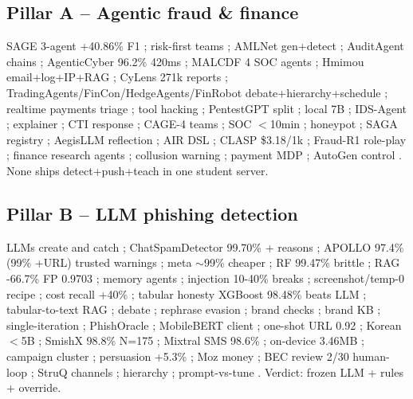 \documentclass[11pt,a4paper]{article}
\begin{document}
\subsection{Pillar A -- Agentic fraud \& finance}
SAGE 3-agent +40.86\% F1 \cite{SAGE26}; risk-first teams \cite{RiskFirst26}; AMLNet gen+detect \cite{AMLNet25}; AuditAgent chains \cite{AuditAgent25}; AgenticCyber 96.2\% 420ms \cite{AgenticCyber25}; MALCDF 4 SOC agents \cite{MALCDF25}; Hmimou email+log+IP+RAG \cite{Hmimou25}; CyLens 271k reports \cite{CyLens25}; TradingAgents/FinCon/HedgeAgents/FinRobot debate+hierarchy+schedule \cite{TradingAgents24,FinCon24,HedgeAgents25,FinRobot24}; realtime payments triage \cite{IJCISIM26}; tool hacking \cite{FangHack24,FangExploit24}; PentestGPT split \cite{PentestGPT24}; local 7B \cite{Rigaki24}; IDS-Agent \cite{IDSAgent24}; explainer \cite{Houssel24}; CTI response \cite{Tellache25}; CAGE-4 teams \cite{Castro25}; SOC $<$10min \cite{Saju26}; honeypot \cite{Honeypot24}; SAGA registry \cite{SAGA25}; AegisLLM reflection \cite{Aegis25}; AIR DSL \cite{AIR26}; CLASP \$3.18/1k \cite{CLASP25}; Fraud-R1 role-play \cite{FraudR125}; finance research agents \cite{Park24,FinAgent24,FinCon24,TradingAgents24,HedgeAgents25,FinRobot24}; collusion warning \cite{Collude25}; payment MDP \cite{Qu25}; AutoGen control \cite{AutoGen24}. None ships detect+push+teach in one student server.
\subsection{Pillar B -- LLM phishing detection}
LLMs create and catch \cite{Heiding24,HeidingIntent24}; ChatSpamDetector 99.70\% + reasons \cite{Koide24}; APOLLO 97.4\% (99\% +URL) trusted warnings \cite{Desolda24}; meta $\sim$99\% cheaper \cite{Nair25}; RF 99.47\% brittle \cite{Algo25}; RAG -66.7\% FP 0.9703 \cite{UserRAG26}; memory agents \cite{MemoPhish26}; injection 10-40\% breaks \cite{Hasan25}; screenshot/temp-0 recipe \cite{Ji25}; cost recall +40\% \cite{CLASP25}; tabular honesty XGBoost 98.48\% beats LLM \cite{FinFraud25}; tabular-to-text RAG \cite{FinFRE25}; debate \cite{PhishDebate25}; rephrase evasion \cite{NextGenPhish24}; brand checks \cite{MMPhish24}; brand KB \cite{KnowPhish24}; single-iteration \cite{PhishAgent25}; PhishOracle \cite{PhishOracle24}; MobileBERT client \cite{PhishLang24}; one-shot URL 0.92 \cite{OneShotURL24}; Korean $<$5B \cite{KorSmish24}; SmishX 98.8\% N=175 \cite{SmishX25}; Mixtral SMS 98.6\% \cite{SpaLLM25}; on-device 3.46MB \cite{COPS24}; campaign cluster \cite{SmishCheck25}; persuasion +5.3\% \cite{Persuade24}; Moz money \cite{MozSmish25}; BEC review 2/30 human-loop \cite{BECReview25}; StruQ channels \cite{StruQ24}; hierarchy \cite{Hierarchy24}; prompt-vs-tune \cite{PromptVsTune24}. Verdict: frozen LLM + rules + override.
\end{document}
